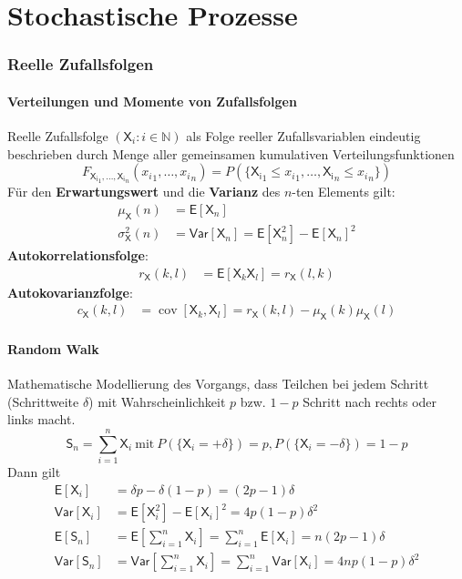 \documentclass[a4paper,twocolumn,10pt]{article}
\DeclareMathOperator{\cov}{cov}
\newcommand{\var}{\mathsf{Var}}
\newcommand{\erw}{\mathsf{E}}
\begin{document}
\part{Stochastische Prozesse}
\section{Reelle Zufallsfolgen}
\subsection{Verteilungen und Momente von Zufallsfolgen}
Reelle Zufallsfolge $(\mathsf{X}_{i}: i \in \mathbb{N})$ als Folge reeller Zufallsvariablen eindeutig beschrieben durch Menge aller gemeinsamen kumulativen Verteilungsfunktionen
\[ F_{\mathsf {X_{i}}_{1},\dots,\mathsf{X_i}_n}({x_i}_1,\dots,{x_i}_n) = P(\{\mathsf {X_i}_1 \leq {x_i}_1, \dots, \mathsf {X_i}_n \leq {x_i}_n\}) \]
Für den \textbf{Erwartungswert} und die \textbf{Varianz} des $n$-ten Elements gilt:
\begin{align}
  \mu_{\mathsf{X}}(n) &= \erw[\mathsf{X}_{n}] \nonumber \\
  \sigma_{\mathsf{X}}^{2}(n) &= \var[\mathsf{X}_{n}] = \erw[\mathsf{X}_{n}^{2}] - \erw[\mathsf{X}_{n}]^{2} \nonumber
\end{align}
\textbf{Autokorrelationsfolge}:
\begin{align}
  r_{\mathsf{X}}(k,l) &= \erw[\mathsf{X}_{k}\mathsf{X}_{l}]=r_{\mathsf{X}}(l,k) \nonumber
\end{align}
\textbf{Autokovarianzfolge}:
\begin{align}
  c_{\mathsf{X}}(k,l) &= \cov[\mathsf{X}_{k},\mathsf{X}_{l}] = r_{\mathsf{X}}(k,l) - \mu_{\mathsf{X}}(k) 
  \mu_{\mathsf{X}}(l) \nonumber
\end{align}

\subsection{Random Walk}
Mathematische Modellierung des Vorgangs, dass Teilchen bei jedem Schritt (Schrittweite $\delta$) mit Wahrscheinlichkeit $p$ bzw. $1-p$ Schritt nach rechts oder links macht.
\[ \mathsf{S}_{n} = \sum \limits_{i=1}^{n} \mathsf{X}_{i} \ \text{mit} \ P(\{\mathsf{X}_{i} = +\delta\}) = p, P(\{\mathsf{X}_{i} = -\delta\}) = 1-p\]
Dann gilt
\begin{align}
  \erw[\mathsf{X}_{i}] &= \delta p - \delta (1-p) = (2p-1) \delta \nonumber \\
  \var[\mathsf{X}_{i}] &= \erw[\mathsf{X}_{i}^{2}] - \erw[\mathsf{X}_{i}]^{2} = 4p(1-p)\delta^{2} \nonumber \\
  \erw[\mathsf{S}_{n}] &= \erw\left[\sum \limits_{i=1}^{n} \mathsf{X}_{i}\right] = \sum \limits_{i=1}^{n} \erw[\mathsf{X}_{i}] = n(2p-1)\delta \nonumber \\
  \var[\mathsf{S}_{n}] &= \var\left[\sum \limits_{i=1}^{n} \mathsf{X}_{i}\right] = \sum \limits_{i=1}^{n} \var[\mathsf{X}_{i}] = 4np(1-p)\delta^{2} \nonumber
\end{align}
\end{document}
